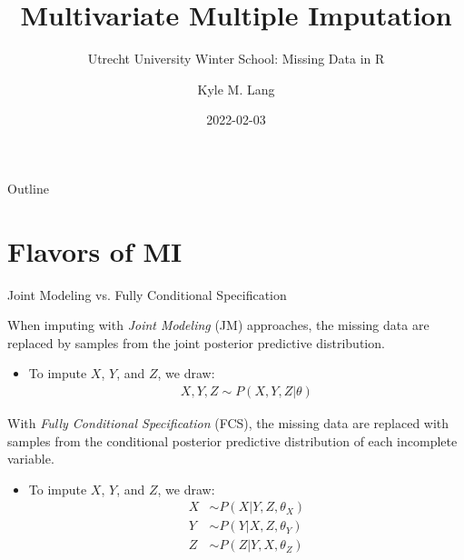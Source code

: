\documentclass[10pt]{beamer}\usepackage[]{graphicx}\usepackage[]{color}
\title{Multivariate Multiple Imputation}
\subtitle{Utrecht University Winter School: Missing Data in R}
\author{Kyle M. Lang}
\institute{Department of Methodology \& Statistics\\Utrecht University}
\date{2022-02-03}
\begin{document}

\begin{frame}[t, plain]
  \titlepage
\end{frame}


\begin{frame}{Outline}
  \tableofcontents
\end{frame}


\section{Flavors of MI}


\begin{frame}{Joint Modeling vs. Fully Conditional Specification}

  When imputing with \emph{Joint Modeling} (JM) approaches, the missing data are 
  replaced by samples from the joint posterior predictive distribution.
  \vb
  \begin{itemize}
    \item To impute $X$, $Y$, and $Z$, we draw:
      \begin{align*}
        X, Y, Z \sim P(X, Y, Z | \theta)
      \end{align*}
  \end{itemize}
  \vb
  With \emph{Fully Conditional Specification} (FCS), the missing data are 
  replaced with samples from the conditional posterior predictive distribution 
  of each incomplete variable.
  \vb
  \begin{itemize}
  \item To impute $X$, $Y$, and $Z$, we draw:
    \begin{align*}
      X &\sim P(X | Y, Z, \theta_X)\\
      Y &\sim P(Y | X, Z, \theta_Y)\\
      Z &\sim P(Z | Y, X, \theta_Z)
    \end{align*}
  \end{itemize}
  
\end{frame}

\end{document}
